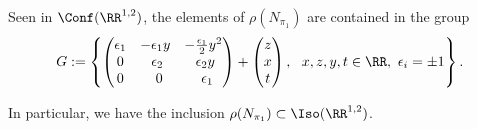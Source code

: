 \begin{lemm}\label{lem.normalisateur}
Seen in $\Conf(\RR^{1,2})$, the elements of $\rho(N_{\pi_1})$ are contained in the group
\[
G:=\left\lbrace
\begin{pmatrix}
\epsilon_1&- \epsilon_1 y&-\frac{\epsilon_1}{2 }y^2\\ 0&\;\epsilon_2 & \;\epsilon_2 y\\0&\;\;0&\;\;\epsilon_1\\
\end{pmatrix} +
\begin{pmatrix} z\\ x\\ t \\
\end{pmatrix}, \ \ x,z,y,t \in \RR, \ \epsilon_i=\pm 1 \right\rbrace.
\]

In particular, we have the inclusion $\rho(N_{\pi_1}) \subset \Iso(\RR^{1,2})$.
\end{lemm}

